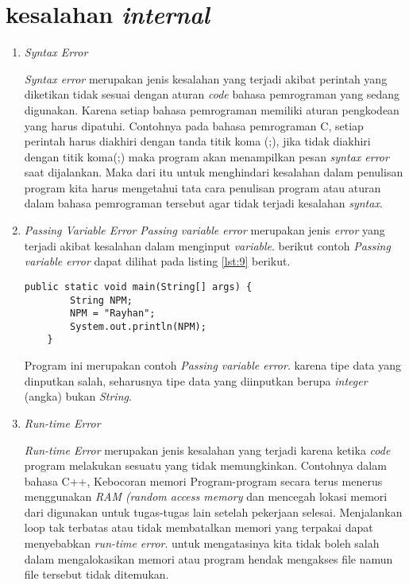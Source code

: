 \section{kesalahan \textit{internal}}
\begin{enumerate}
\item \textit{Syntax Error}
\par 
\textit{Syntax error} merupakan jenis kesalahan yang terjadi akibat perintah yang diketikan tidak sesuai dengan aturan \textit{code} bahasa pemrograman yang sedang digunakan. Karena setiap bahasa pemrograman memiliki aturan pengkodean yang harus dipatuhi. Contohnya pada bahasa pemrograman C, setiap perintah harus diakhiri dengan tanda titik koma (;), jika tidak diakhiri dengan titik koma(;) maka program akan menampilkan pesan \textit{syntax error} saat dijalankan. Maka dari itu untuk menghindari kesalahan dalam penulisan program kita harus mengetahui tata cara penulisan program atau aturan dalam bahasa pemrograman tersebut agar tidak terjadi kesalahan \textit{syntax}.

\item \textit{Passing Variable Error}
\textit{Passing variable error} merupakan jenis \textit{error} yang terjadi akibat kesalahan dalam menginput \textit{variable}. berikut contoh \textit{Passing variable error} dapat dilihat pada listing \ref{lst:9} berikut.
\begin{lstlisting}[caption=Contoh commit standar,label={lst:9}]
public static void main(String[] args) {	
		String NPM;		
		NPM = "Rayhan";
		System.out.println(NPM);
	}
\end{lstlisting}
Program ini merupakan contoh \textit{Passing variable error}. karena tipe data yang dinputkan salah, seharusnya tipe data yang diinputkan berupa \textit{integer} (angka) bukan \textit{String}.

\item \textit{Run-time Error}
\par
\textit{Run-time Error} merupakan jenis kesalahan yang terjadi karena ketika \textit{code} program melakukan sesuatu yang tidak memungkinkan. Contohnya dalam bahasa C++, Kebocoran memori Program-program secara terus menerus menggunakan \textit{RAM (random access memory} dan mencegah lokasi memori dari digunakan untuk tugas-tugas lain setelah pekerjaan selesai. Menjalankan loop tak terbatas atau tidak membatalkan memori yang terpakai dapat menyebabkan \textit{run-time error}. untuk mengatasinya kita tidak boleh salah dalam mengalokasikan memori atau program hendak mengakses file namun file tersebut tidak ditemukan.


\end{enumerate}
